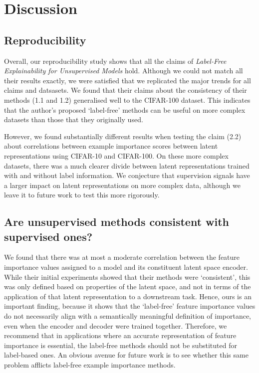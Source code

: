 


\section{Discussion}
\label{sec:discussion}
\subsection{Reproducibility}
Overall, our reproducibility study shows that all the claims of  \textit{Label-Free Explainability for Unsupervised Models} hold. Although we could not match all their results exactly, we were satisfied that we replicated the major trends for all claims and datsasets. We found that their claims about the consistency of their methods (1.1 and 1.2) generalised well to the CIFAR-100 dataset. This indicates that the author’s proposed ‘label-free’ methods can be useful on more complex datasets than those that they originally used.

However, we found substantially different results when testing the claim (2.2) about correlations between example importance scores between latent representations using CIFAR-10 and CIFAR-100. On these more complex datasets, there was a much clearer divide between latent representations trained with and without label information. We conjecture that supervision signals have a larger impact on latent representations on more complex data, although we leave it to future work to test this more rigorously.


\subsection{Are unsupervised methods consistent with supervised ones?}
We found that there was at most a moderate correlation between the feature importance values assigned to a model and its constituent latent space encoder. While their initial experiments showed that their methods were ‘consistent’, this was only defined based on properties of the latent space, and not in terms of the application of that latent representation to a downstream task. Hence, ours is an important finding, because it shows that the ‘label-free’ feature importance values do not necessarily align with a semantically meaningful definition of importance, even when the encoder and decoder were trained together. Therefore, we recommend that in applications where an accurate representation of feature importance is essential, the label-free methods should not be substituted for label-based ones. An obvious avenue for future work is to see whether this same problem afflicts label-free example importance methods.


